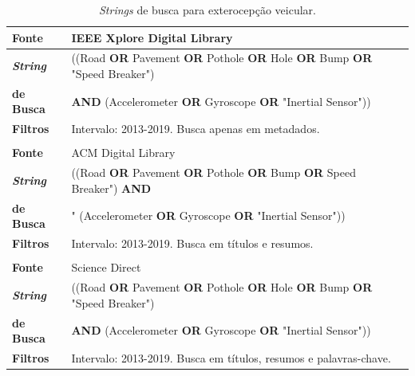 \begin{table}[h!]
    \caption{\textit{Strings} de busca para exterocepção veicular.}
    \label{tabela:percepcao_ambiente_busca}
    \centering
    \small
    \begin{tabular}{l l}
        
        \toprule
        \textbf{Fonte} & IEEE Xplore Digital Library \\
        \midrule
        \textbf{\textit{String}} & ((Road \textbf{OR} Pavement \textbf{OR} Pothole \textbf{OR} Hole \textbf{OR} Bump \textbf{OR} "Speed Breaker") \\ \textbf{de Busca} &  \textbf{AND} (Accelerometer \textbf{OR} Gyroscope \textbf{OR} "Inertial Sensor")) \\
        \midrule
        \textbf{Filtros} & Intervalo: 2013-2019. Busca apenas em metadados. \\
        \bottomrule
        
        \\
        
        \toprule
        \textbf{Fonte} & ACM Digital Library \\
        \midrule
        \textbf{\textit{String}} & ((Road \textbf{OR} Pavement \textbf{OR} Pothole \textbf{OR} Bump \textbf{OR} Speed Breaker") \textbf{AND} \\ \textbf{de Busca} & " (Accelerometer \textbf{OR} Gyroscope \textbf{OR} "Inertial Sensor")) \\ 
        \midrule
        \textbf{Filtros} & Intervalo: 2013-2019. Busca em títulos e resumos. \\ 
        \bottomrule
        
        \\
        
        \toprule
        \textbf{Fonte} & Science Direct \\
        \midrule
        \textbf{\textit{String}} & ((Road \textbf{OR} Pavement \textbf{OR} Pothole \textbf{OR} Hole \textbf{OR} Bump \textbf{OR} "Speed Breaker") \\ \textbf{de Busca} &  \textbf{AND} (Accelerometer \textbf{OR} Gyroscope \textbf{OR} "Inertial Sensor")) \\ 
        \midrule
        \textbf{Filtros} & Intervalo: 2013-2019. Busca em títulos, resumos e palavras-chave. \\
        \bottomrule
    \end{tabular}
\end{table}

